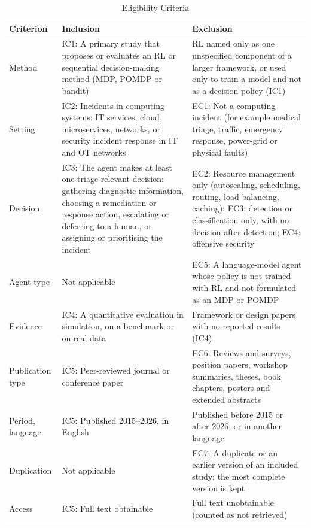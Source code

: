 \begin{table}[!t]
\centering
\caption{Eligibility Criteria}
\label{tab:criteria}
\footnotesize
\begin{tabularx}{\textwidth}{@{}P{1.6cm}LL@{}}
\toprule
Criterion & Inclusion & Exclusion \\
\midrule
Method & IC1: A primary study that proposes or evaluates an RL or sequential decision-making method (MDP, POMDP or bandit) & RL named only as one unspecified component of a larger framework, or used only to train a model and not as a decision policy (IC1) \\
Setting & IC2: Incidents in computing systems: IT services, cloud, microservices, networks, or security incident response in IT and OT networks & EC1: Not a computing incident (for example medical triage, traffic, emergency response, power-grid or physical faults) \\
Decision & IC3: The agent makes at least one triage-relevant decision: gathering diagnostic information, choosing a remediation or response action, escalating or deferring to a human, or assigning or prioritising the incident & EC2: Resource management only (autoscaling, scheduling, routing, load balancing, caching); EC3: detection or classification only, with no decision after detection; EC4: offensive security \\
Agent type & Not applicable & EC5: A language-model agent whose policy is not trained with RL and not formulated as an MDP or POMDP \\
Evidence & IC4: A quantitative evaluation in simulation, on a benchmark or on real data & Framework or design papers with no reported results (IC4) \\
Publication type & IC5: Peer-reviewed journal or conference paper & EC6: Reviews and surveys, position papers, workshop summaries, theses, book chapters, posters and extended abstracts \\
Period, language & IC5: Published 2015--2026, in English & Published before 2015 or after 2026, or in another language \\
Duplication & Not applicable & EC7: A duplicate or an earlier version of an included study; the most complete version is kept \\
Access & IC5: Full text obtainable & Full text unobtainable (counted as not retrieved) \\
\bottomrule
\end{tabularx}
\end{table}

